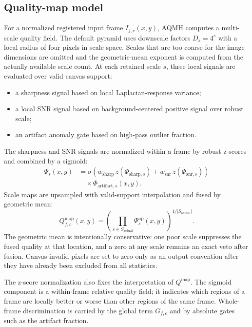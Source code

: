 \documentclass[10pt,twocolumn]{article}
\begin{document}
\subsection{Quality-map model}

For a normalized registered input frame $I_{f,c}(x,y)$, AQMH computes a multi-scale quality
field. The default pyramid uses downscale factors $D_s=4^s$ with a local radius of four
pixels in scale space. Scales that are too coarse for the image dimensions are omitted and the
geometric-mean exponent is computed from the actually available scale count. At each retained
scale $s$, three local signals are evaluated over valid canvas support:
\begin{itemize}
  \item a sharpness signal based on local Laplacian-response variance;
  \item a local SNR signal based on background-centered positive signal over robust scale;
  \item an artifact anomaly gate based on high-pass outlier fraction.
\end{itemize}
The sharpness and SNR signals are normalized within a frame by robust z-scores and combined by a
sigmoid:
\begin{equation}
\begin{split}
  \Psi_s(x,y) &=
  \sigma\!\left(
    w_{\mathrm{sharp}}\, z(\Phi_{\mathrm{sharp},s})
    + w_{\mathrm{snr}}\, z(\Phi_{\mathrm{snr},s})
  \right) \\
  &\quad \times \Phi_{\mathrm{artifact},s}(x,y).
\end{split}
\end{equation}
Scale maps are upsampled with valid-support interpolation and fused by geometric mean:
\begin{equation}
  Q_{f,c}^{\mathrm{map}}(x,y) =
  \left(\prod_{s \in S_{\mathrm{actual}}} \Psi_s^{\mathrm{up}}(x,y)\right)^{1/|S_{\mathrm{actual}}|}.
\end{equation}
The geometric mean is intentionally conservative: one poor scale suppresses the fused quality at
that location, and a zero at any scale remains an exact veto after fusion. Canvas-invalid pixels
are set to zero only as an output convention after they have already been excluded from all
statistics.

The z-score normalization also fixes the interpretation of $Q^{\mathrm{map}}$. The sigmoid
component is a within-frame relative quality field; it indicates which regions of a frame are
locally better or worse than other regions of the same frame. Whole-frame discrimination is
carried by the global term $G_{f,c}$ and by absolute gates such as the artifact fraction.
\end{document}
